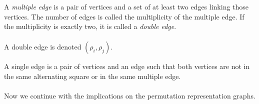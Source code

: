 \begin{definition}

  A \textit{multiple edge} is a pair of vertices and a set of at least two edges linking those vertices. The number of edges is called the multiplicity of the multiple edge. If the multiplicity is exactly two, it is called a \textit{double edge}.

  \begin{figure}[H]
    \begin{center}
      \caption{}
    \end{center}
  \end{figure}

  \paragraph{}
  A double edge is denoted $(\rho_i, \rho_j)$.
\end{definition}

\begin{definition}
  A single edge is a pair of vertices and an edge such that both vertices are not in the same alternating square or in the same multiple edge.
\end{definition}

\paragraph{}
Now we continue with the implications on the permutation representation graphs.

